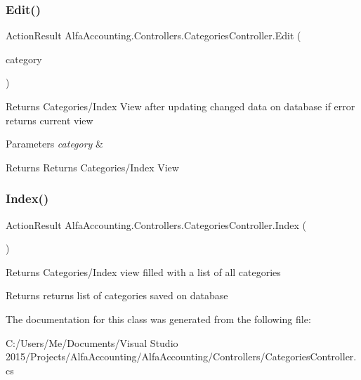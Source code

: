 \subsubsection{\texorpdfstring{Edit()}{Edit()}\hspace{0.1cm}{\footnotesize\ttfamily [2/2]}}
{\footnotesize\ttfamily Action\+Result Alfa\+Accounting.\+Controllers.\+Categories\+Controller.\+Edit (\begin{DoxyParamCaption}\item[{\mbox{[}\+Bind(\+Include = \char`\"{}\+Category\+Id,\+Category\+Name\char`\"{})\mbox{]} Category}]{category }\end{DoxyParamCaption})}



Returns Categories/\+Index View after updating changed data on database if error returns current view 


\begin{DoxyParams}{Parameters}
{\em category} & \\
\hline
\end{DoxyParams}
\begin{DoxyReturn}{Returns}
Returns Categories/\+Index View
\end{DoxyReturn}
\mbox{\label{class_alfa_accounting_1_1_controllers_1_1_categories_controller_a0a0bd358cfb6fc63f52f4a8c7d86b23f}} 
\subsubsection{\texorpdfstring{Index()}{Index()}}
{\footnotesize\ttfamily Action\+Result Alfa\+Accounting.\+Controllers.\+Categories\+Controller.\+Index (\begin{DoxyParamCaption}{ }\end{DoxyParamCaption})}



Returns Categories/\+Index view filled with a list of all categories 

\begin{DoxyReturn}{Returns}
returns list of categories saved on database 
\end{DoxyReturn}


The documentation for this class was generated from the following file\+:\begin{DoxyCompactItemize}
\item 
C\+:/\+Users/\+Me/\+Documents/\+Visual Studio 2015/\+Projects/\+Alfa\+Accounting/\+Alfa\+Accounting/\+Controllers/Categories\+Controller.\+cs\end{DoxyCompactItemize}
